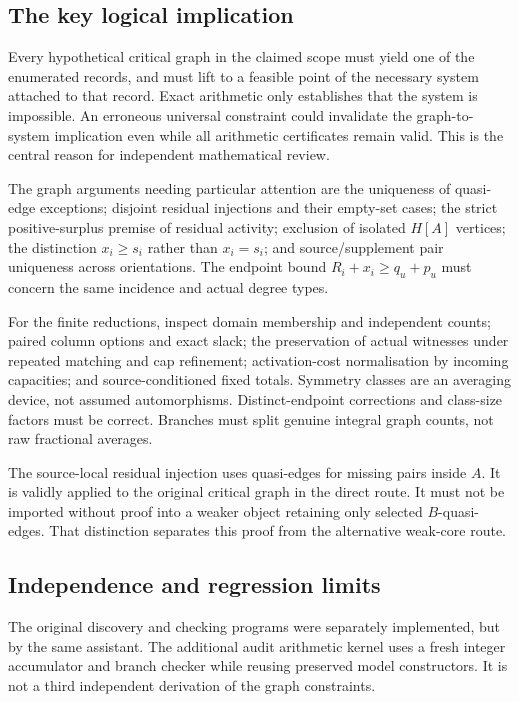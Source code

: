 \documentclass[11pt,a4paper]{article}
\begin{document}
\subsection{The key logical implication}
Every hypothetical critical graph in the claimed scope must yield one of the enumerated records, and must lift to a feasible point of the necessary system attached to that record. Exact arithmetic only establishes that the system is impossible. An erroneous universal constraint could invalidate the graph-to-system implication even while all arithmetic certificates remain valid. This is the central reason for independent mathematical review.

The graph arguments needing particular attention are the uniqueness of quasi-edge exceptions; disjoint residual injections and their empty-set cases; the strict positive-surplus premise of residual activity; exclusion of isolated $H[A]$ vertices; the distinction $x_i\ge s_i$ rather than $x_i=s_i$; and source/supplement pair uniqueness across orientations. The endpoint bound $R_i+x_i\ge q_u+p_u$ must concern the same incidence and actual degree types.

For the finite reductions, inspect domain membership and independent counts; paired column options and exact slack; the preservation of actual witnesses under repeated matching and cap refinement; activation-cost normalisation by incoming capacities; and source-conditioned fixed totals. Symmetry classes are an averaging device, not assumed automorphisms. Distinct-endpoint corrections and class-size factors must be correct. Branches must split genuine integral graph counts, not raw fractional averages.

The source-local residual injection uses quasi-edges for missing pairs inside $A$. It is validly applied to the original critical graph in the direct route. It must not be imported without proof into a weaker object retaining only selected $B$-quasi-edges. That distinction separates this proof from the alternative weak-core route.

\subsection{Independence and regression limits}
The original discovery and checking programs were separately implemented, but by the same assistant. The additional audit arithmetic kernel uses a fresh integer accumulator and branch checker while reusing preserved model constructors. It is not a third independent derivation of the graph constraints.
\end{document}

